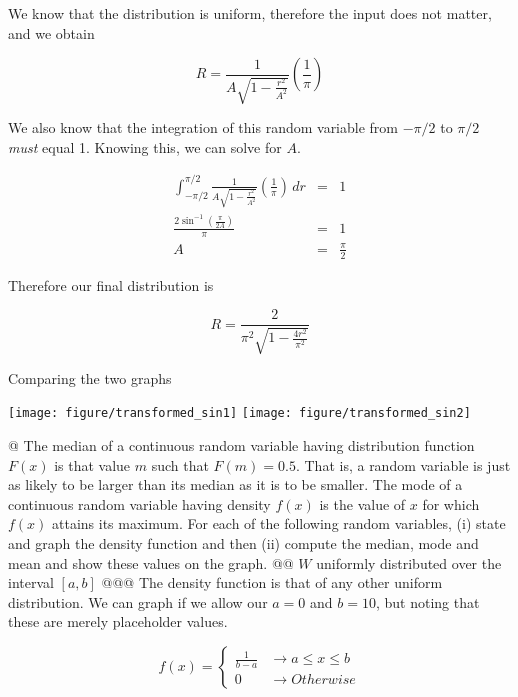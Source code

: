 \documentclass[10pt]{article}\usepackage[]{graphicx}\usepackage[]{xcolor}
\makeatletter
\def\maxwidth{ %
  \ifdim\Gin@nat@width>\linewidth
    \linewidth
  \else
    \Gin@nat@width
  \fi
}
\newenvironment{knitrout}{}{} %
\makeatother
\begin{document}
\begin{easylist}[enumerate]
    We know that the distribution is uniform, therefore the input does not matter, and we obtain

    \[
        R = \frac{1}{A \sqrt{1-\frac{r^2}{A^2}}} \left( \frac{1}{\pi} \right)
    \]

    We also know that the integration of this random variable from $-\pi/2$ to $\pi/2$ \textit{must} equal 1. Knowing
    this, we can solve for $A$.

    \[
        \begin{aligned}
            \int^{\pi/2}_{-\pi/2} \frac{1}{A \sqrt{1-\frac{r^2}{A^2}}} \left( \frac{1}{\pi} \right) \, dr &=& 1\\
            \frac{2 \sin^{-1} \left( \frac{\pi }{2 A} \right)}{\pi} &=& 1\\
            A &=& \frac{\pi}{2}
        \end{aligned}
    \]

    Therefore our final distribution is

    \[
        R = \frac{2}{\pi^2 \sqrt{1-\frac{4r^2}{\pi^2}}}
    \]

    Comparing the two graphs

\begin{knitrout}
\color{fgcolor}

{\centering \texttt{[image: figure/transformed\_sin1]} 
\texttt{[image: figure/transformed\_sin2]} 

}



\end{knitrout}


    @ The median of a continuous random variable having distribution function $F(x)$ is that value $m$ such that $F(m) =
    0.5$. That is, a random variable is just as likely to be larger than its median as it is to be smaller. The mode of
    a continuous random variable having density $f(x)$ is the value of $x$ for which $f(x)$ attains its maximum. For
    each of the following random variables, (i) state and graph the density function and then (ii) compute the median,
    mode and mean and show these values on the graph.
    @@ $W$ uniformly distributed over the interval $[a, b]$
    @@@ The density function is that of any other uniform distribution. We can graph if we allow our $a=0$ and $b=10$,
    but noting that these are merely placeholder values.

    \[
        f(x) =
        \begin{cases}
            \frac{1}{b - a} &\to a \le x \le b\\
            0 &\to Otherwise
        \end{cases}
    \]


\end{easylist}
\end{document}
